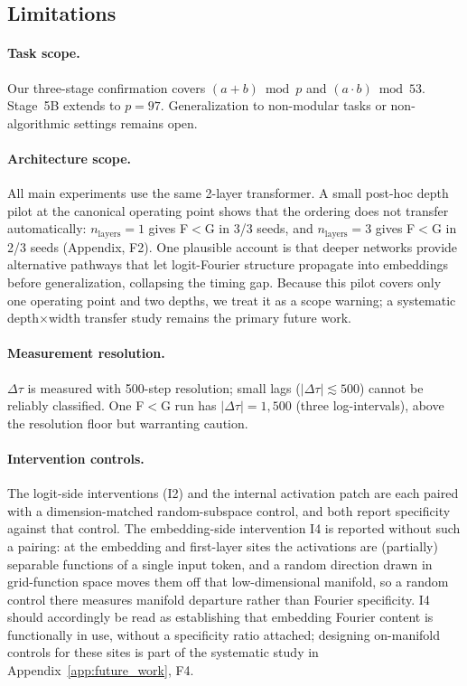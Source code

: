 \documentclass{article}
\newcommand{\Dtau}{\Delta\tau}
\begin{document}
\subsection{Limitations}
\label{sec:limitations}

\paragraph{Task scope.}
Our three-stage confirmation covers $(a+b)\bmod p$ and $(a\cdot b)\bmod 53$.
Stage~5B extends to $p{=}97$.
Generalization to non-modular tasks or non-algorithmic settings
remains open.

\paragraph{Architecture scope.}
All main experiments use the same 2-layer transformer.
A small post-hoc depth pilot at the canonical operating point
shows that the ordering does not transfer automatically:
$n_{\mathrm{layers}}{=}1$ gives F${<}$G in 3/3 seeds, and
$n_{\mathrm{layers}}{=}3$ gives F${<}$G in 2/3 seeds
(Appendix, F2).
One plausible account is that deeper networks provide alternative
pathways that let logit-Fourier structure propagate into embeddings
before generalization, collapsing the timing gap.
Because this pilot covers only one operating point and two depths,
we treat it as a scope warning; a systematic depth$\times$width
transfer study remains the primary future work.

\paragraph{Measurement resolution.}
$\Dtau$ is measured with 500-step resolution;
small lags ($|\Dtau|\lesssim500$) cannot be reliably classified.
One F$<$G run has $|\Dtau|=1{,}500$ (three log-intervals),
above the resolution floor but warranting caution.

\paragraph{Intervention controls.}
The logit-side interventions (I2) and the internal activation
patch are each paired with a dimension-matched random-subspace
control, and both report specificity against that control.
The embedding-side intervention I4 is reported without such a
pairing: at the embedding and first-layer sites the activations
are (partially) separable functions of a single input token, and
a random direction drawn in grid-function space moves them off
that low-dimensional manifold, so a random control there measures
manifold departure rather than Fourier specificity.
I4 should accordingly be read as establishing that embedding
Fourier content is functionally in use, without a specificity
ratio attached; designing on-manifold controls for these sites is
part of the systematic study in
Appendix~\ref{app:future_work}, F4.
\end{document}
